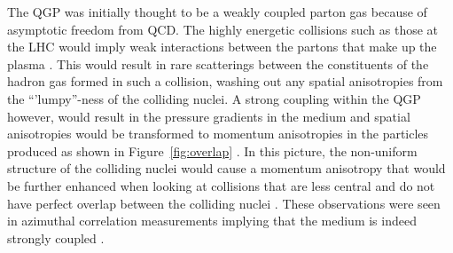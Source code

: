 The QGP was initially thought to be a weakly coupled parton gas because of asymptotic freedom from QCD.
The highly energetic collisions such as those at the LHC would imply weak interactions between the partons that make up the plasma \cite{PhysRevLett.34.1353, heinz2013collective, 10.1007/978-1-4020-2705-5_14}.
This would result in rare scatterings between the constituents of the hadron gas formed in such a collision, washing out any spatial anisotropies from the ``'lumpy''-ness of the colliding nuclei.
A strong coupling within the QGP however, would result in the pressure gradients in the medium and spatial anisotropies would be transformed to momentum anisotropies in the particles produced as shown in Figure~\ref{fig:overlap} \cite{Busza:2018rrf}.
In this picture, the non-uniform structure of the colliding nuclei would cause a momentum anisotropy \cite{Ster:1999ib} that would be further enhanced when looking at collisions that are less central and do not have perfect overlap between the colliding nuclei \cite{Poskanzer:1999ea, Pinkenburg:1999ya}.
These observations were seen in azimuthal correlation measurements implying that the medium is indeed strongly coupled \cite{Aaboud:2018ves, PhysRevLett.91.182301, Sirunyan:2017fts, PhysRevLett.116.132302}.

